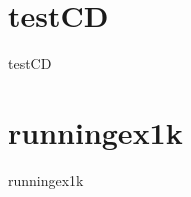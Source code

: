 \section{testCD}
\label{dataSets:testCD}
\begin{dataSetDescription}{testCD}
\end{dataSetDescription}

\section{runningex1k}
\label{dataSets:runningex1k}
\begin{dataSetDescription}{runningex1k}
\end{dataSetDescription}

